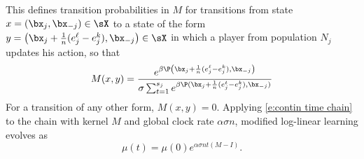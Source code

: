 This defines transition probabilities in $M$ for transitions from state $x = (\bx_{j},\bx_{-j})\in \sX$ to a state of the form $y = \left(\bx_{j} + \frac{1}{n}(e^{\ell}_j - e_j^k),\bx_{-j}\right)\in \sX$ in which a player from population $N_j$ updates his action, so that
\begin{align}
M(x,y) =\frac{e^{\beta \P\left(\bx_{j} + \frac{1}{n}(e^{\ell}_j - e_j^k),\bx_{-j}\right)}}{\sigma\sum_{t =1}^{s_j} e^{\beta\P(\bx_{j} + \frac{1}{n}(e^{t}_j - e_j^k), \bx_{-j})}}\label{e:Markov transition probs}
\end{align}
\normalsize
For a transition of any other form, 
$M(x,y) = 0.$
Applying \eqref{e:contin time chain} to the chain with kernel $M$ and global clock rate $\alpha\sigma n$, modified log-linear learning evolves as
\begin{equation}
\mu(t) = \mu(0)e^{\alpha\sigma n t (M-I)}.
\end{equation}

